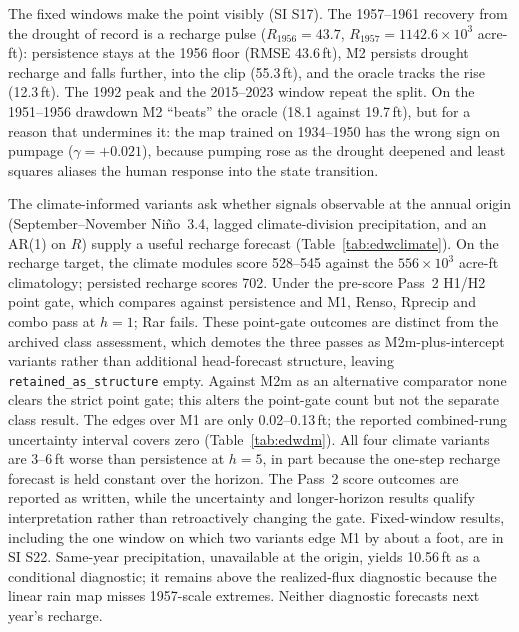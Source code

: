 The fixed windows make the point visibly (SI S17). The 1957--1961 recovery from the drought of record is a recharge pulse ($R_{1956}=43.7$, $R_{1957}=1142.6\times10^3$ acre-ft): persistence stays at the 1956 floor (RMSE 43.6\,ft), M2 persists drought recharge and falls further, into the clip (55.3\,ft), and the oracle tracks the rise (12.3\,ft). The 1992 peak and the 2015--2023 window repeat the split. On the 1951--1956 drawdown M2 ``beats'' the oracle (18.1 against 19.7\,ft), but for a reason that undermines it: the map trained on 1934--1950 has the wrong sign on pumpage ($\gamma=+0.021$), because pumping rose as the drought deepened and least squares aliases the human response into the state transition.

The climate-informed variants ask whether signals observable at the annual origin (September--November Ni\~no~3.4, lagged climate-division precipitation, and an AR(1) on $R$) supply a useful recharge forecast (Table~\ref{tab:edwclimate}). On the recharge target, the climate modules score 528--545 against the $556\times10^3$ acre-ft climatology; persisted recharge scores 702. Under the pre-score Pass~2 H1/H2 point gate, which compares against persistence and M1, Renso, Rprecip and combo pass at $h=1$; Rar fails. These point-gate outcomes are distinct from the archived class assessment, which demotes the three passes as M2m-plus-intercept variants rather than additional head-forecast structure, leaving \texttt{retained\_as\_structure} empty. Against M2m as an alternative comparator none clears the strict point gate; this alters the point-gate count but not the separate class result. The edges over M1 are only 0.02--0.13\,ft; the reported combined-rung uncertainty interval covers zero (Table~\ref{tab:edwdm}). All four climate variants are 3--6\,ft worse than persistence at $h=5$, in part because the one-step recharge forecast is held constant over the horizon. The Pass~2 score outcomes are reported as written, while the uncertainty and longer-horizon results qualify interpretation rather than retroactively changing the gate. Fixed-window results, including the one window on which two variants edge M1 by about a foot, are in SI S22. Same-year precipitation, unavailable at the origin, yields 10.56\,ft as a conditional diagnostic; it remains above the realized-flux diagnostic because the linear rain map misses 1957-scale extremes. Neither diagnostic forecasts next year's recharge.

